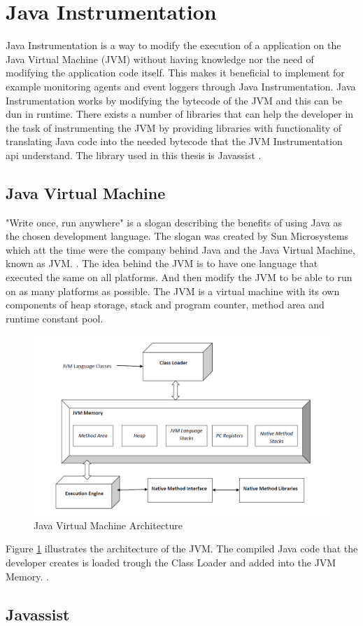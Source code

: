 \section{Java Instrumentation}
\label{JavaInstrumentation}
Java Instrumentation is a way to modify the execution of a application on the Java Virtual Machine (JVM) without having knowledge nor the need of modifying the application code itself. This makes it beneficial to implement for example monitoring agents and event loggers through Java Instrumentation. Java Instrumentation works by modifying the bytecode of the JVM \parencite{Java_Instrument} and this can be dun in runtime. There exists a number of libraries that can help the developer in the task of instrumenting the JVM by providing libraries with functionality of translating Java code into the needed bytecode that the JVM Instrumentation api understand. The library used in this thesis is Javassist \parencite{Javassist}.

\subsection{Java Virtual Machine}
"Write once, run anywhere" is a slogan describing the benefits of using Java as the chosen development language. The slogan was created by Sun Microsystems which att the time were the company behind Java and the Java Virtual Machine, known as JVM. \parencite{Craig_2006}. The idea behind the JVM is to have one language that executed the same on all platforms. And then modify the JVM to be able to run on as many platforms as possible. The JVM is a virtual machine with its own components of heap storage, stack and program counter, method area and runtime constant pool. 

\begin{figure}
  \centering
  \includegraphics[width=\textwidth]{images/JvmSpec7.png}
  \caption{Java Virtual Machine Architecture}
  \label{fig:JVM}
\end{figure}

Figure \ref{fig:JVM} illustrates the architecture of the JVM. The compiled Java code that the developer creates is loaded trough the Class Loader and added into the JVM Memory. \parencite{venners_1999}.

\subsection{Javassist}
